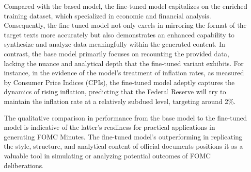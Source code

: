 Compared with the based model, the fine-tuned model capitalizes on the enriched training dataset, which specialized in economic and financial analysis. Consequently, the fine-tuned model not only excels in mirroring the format of the target texts more accurately but also demonstrates an enhanced capability to synthesize and analyze data meaningfully within the generated content. In contrast, the base model primarily focuses on recounting the provided data, lacking the nuance and analytical depth that the fine-tuned variant exhibits. For instance, in the evidence of the model's treatment of inflation rates, as measured by Consumer Price Indices (CPIs), the fine-tuned model adeptly captures the dynamics of rising inflation, predicting that the Federal Reserve will try to maintain the inflation rate at a relatively subdued level, targeting around 2\%.

The qualitative comparison in performance from the base model to the fine-tuned model is indicative of the latter's readiness for practical applications in generating FOMC Minutes. The fine-tuned model's outperforming in replicating the style, structure, and analytical content of official documents positions it as a valuable tool in simulating or analyzing potential outcomes of FOMC deliberations. 


